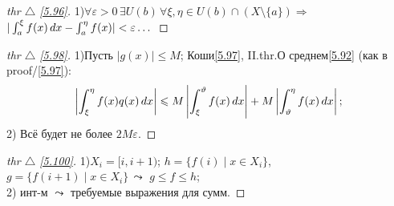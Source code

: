 \begin{minipage}[]{0.45\textwidth}
\begin{proof}[
thr $\triangle$
\eqref{5.96}]

\phantom{42}
\noindent

1)$\forall \varepsilon > 0 \, \exists U(b) \, \forall \xi,\eta\in U(b)\cap(X\setminus\{a\})\Rightarrow$\\
 $|\int_a^\xi f(x)\, d x - \int_a^\eta f(x)|<\varepsilon\dots $
\end{proof}


\begin{proof}[
 thr $\triangle$
\eqref{5.98}]
	
\phantom{42}
\noindent

1)Пусть $|g(x)| \leq M$; Коши\eqref{5.97}, II.thr.О среднем\eqref{5.92} (как в proof/\ref{5.97}):\\
\begin{equation*}
\begin{aligned}
	\left|\int_\xi^\eta f(x) q(x) \, d x \right| \leqslant  M \left|\int_\xi^\vartheta f(x) \, d x \right| + M \left| \int_\vartheta^\eta f(x) \, d x \right|;
\end{aligned}
\end{equation*}
2) Всё будет не более $2 M \varepsilon$.
\end{proof}


\begin{proof}[
 thr $\triangle$
\eqref{5.100}]
	
\phantom{42}
\noindent

1)$ X_i = [i, i+1)$; $h = \{ f(i) \mid x \in X_i \}$, $g = \{ f(i+1) \mid x \in X_i \}\,\leadsto$ $g\leq f \leq h$;\\
2) инт-м $\leadsto$ требуемые выражения для сумм.

\end{proof}
\end{minipage}